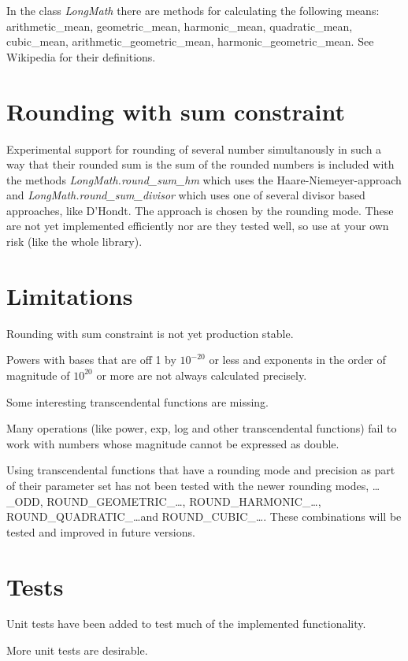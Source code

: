 \documentclass[10pt,a4paper]{article}
\begin{document}
In the class {\slshape LongMath} there are methods for calculating the
following means: arithmetic\_mean, geometric\_mean, harmonic\_mean,
quadratic\_mean, cubic\_mean, arithmetic\_geometric\_mean,
harmonic\_geometric\_mean.  See Wikipedia for their definitions.

\section{Rounding with sum constraint}

Experimental support for rounding of several number simultanously in
such a way that their rounded sum is the sum of the rounded numbers is
included with the methods {\slshape LongMath.round\_sum\_hm} which uses
the Haare-Niemeyer-approach and {\slshape LongMath.round\_sum\_divisor}
which uses one of several divisor based approaches, like D'Hondt. The
approach is chosen by the rounding mode. These are not yet implemented
efficiently nor are they tested well, so use at your own risk (like
the whole library).

\section{Limitations}

Rounding with sum constraint is not yet production stable.

Powers with bases that are off 1 by $10^{-20}$ or less and exponents
in the order of magnitude of $10^20$ or more are not always calculated
precisely.

Some interesting transcendental functions are missing.

Many operations (like power, exp, log and other transcendental functions) fail to work with numbers whose magnitude cannot be
expressed as double.

Using transcendental functions that have a rounding mode and precision
as part of their parameter set has not been tested with the newer
rounding modes, \dots\_ODD, ROUND\_GEOMETRIC\_\dots,
ROUND\_HARMONIC\_\dots, ROUND\_QUADRATIC\_\dots and
ROUND\_CUBIC\_\dots.
These combinations will be tested and improved in future versions.

\section{Tests}

Unit tests have been added to test much of the implemented
functionality.

More unit tests are desirable.
\end{document}

